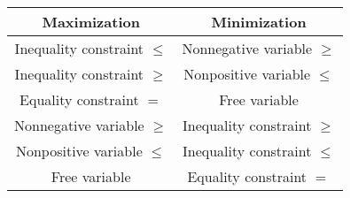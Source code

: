 \begin{center}
\begin{tabular}{c|c}
Maximization & Minimization \\
\hline
Inequality constraint $\le$ & Nonnegative variable $\ge$ \\
Inequality constraint $\ge$ & Nonpositive variable $\le$ \\
Equality constraint $=$ & Free variable \\
Nonnegative variable $\ge$ & Inequality constraint $\ge$ \\
Nonpositive variable $\le$ & Inequality constraint $\le$ \\
Free variable & Equality constraint $=$ \\
\end{tabular}
\end{center}